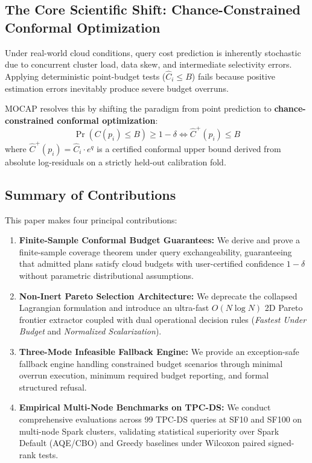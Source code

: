 \documentclass[journal,10pt,onecolumn]{article}
\begin{document}
\subsection{The Core Scientific Shift: Chance-Constrained Conformal Optimization}
Under real-world cloud conditions, query cost prediction is inherently stochastic due to concurrent cluster load, data skew, and intermediate selectivity errors. Applying deterministic point-budget tests ($\hat{C}_i \le B$) fails because positive estimation errors inevitably produce severe budget overruns.

MOCAP resolves this by shifting the paradigm from point prediction to \textbf{chance-constrained conformal optimization}:
\begin{equation}
    \Pr\left( C(p_i) \le B \right) \ge 1 - \delta \iff \hat{C}^+(p_i) \le B
\end{equation}
where $\hat{C}^+(p_i) = \hat{C}_i \cdot e^q$ is a certified conformal upper bound derived from absolute log-residuals on a strictly held-out calibration fold.

\subsection{Summary of Contributions}
This paper makes four principal contributions:
\begin{enumerate}
    \item \textbf{Finite-Sample Conformal Budget Guarantees:} We derive and prove a finite-sample coverage theorem under query exchangeability, guaranteeing that admitted plans satisfy cloud budgets with user-certified confidence $1 - \delta$ without parametric distributional assumptions.
    \item \textbf{Non-Inert Pareto Selection Architecture:} We deprecate the collapsed Lagrangian formulation and introduce an ultra-fast $O(N \log N)$ 2D Pareto frontier extractor coupled with dual operational decision rules (\emph{Fastest Under Budget} and \emph{Normalized Scalarization}).
    \item \textbf{Three-Mode Infeasible Fallback Engine:} We provide an exception-safe fallback engine handling constrained budget scenarios through minimal overrun execution, minimum required budget reporting, and formal structured refusal.
    \item \textbf{Empirical Multi-Node Benchmarks on TPC-DS:} We conduct comprehensive evaluations across 99 TPC-DS queries at SF10 and SF100 on multi-node Spark clusters, validating statistical superiority over Spark Default (AQE/CBO) and Greedy baselines under Wilcoxon paired signed-rank tests.
\end{enumerate}
\end{document}
